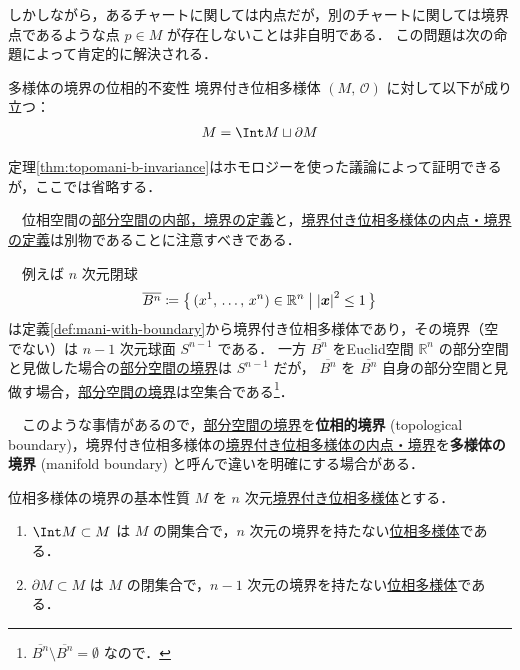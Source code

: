 \documentclass[geometry_main]{subfiles}
\begin{document}
しかしながら，あるチャートに関しては内点だが，別のチャートに関しては境界点であるような点 $p \in M$ が存在しないことは非自明である．
この問題は次の命題によって肯定的に解決される．

\begin{mytheo}[label=thm:topomani-b-invariance]{多様体の境界の位相的不変性}
	境界付き位相多様体 $(M,\, \mathscr{O})$ に対して以下が成り立つ：
	\begin{align}
		M = \Int M \sqcup \partial M
	\end{align}
\end{mytheo}

定理\ref{thm:topomani-b-invariance}はホモロジーを使った議論によって証明できるが，ここでは省略する．

\begin{marker}
	　位相空間の\hyperref[def:boundary-topo]{部分空間の内部，境界の定義}と，\hyperref[def:int-manifold-with-boundary]{境界付き位相多様体の内点・境界の定義}は別物であることに注意すべきである．

	　例えば $n$ 次元閉球
	\begin{align}
		\overline{B^n} \coloneqq \bigl\{\, (x^1,\, \dots ,\, x^n) \in \mathbb{R}^n \bigm| \abs{\vb*{x}}^2 \le 1 \,\bigr\} 
	\end{align}
	は定義\ref{def:mani-with-boundary}から境界付き位相多様体であり，その境界（空でない）は $n-1$ 次元球面 $S^{n-1}$ である．
	一方 $\overline{B^n}$ をEuclid空間 $\mathbb{R}^n$ の部分空間と見做した場合の\hyperref[def:boundary-topo]{部分空間の境界}は $S^{n-1}$ だが，
	$\overline{B^n}$ を $\overline{B^n}$ 自身の部分空間と見做す場合，\hyperref[def:boundary-topo]{部分空間の境界}は空集合である\footnote{$\overline{B^n} \setminus \overline{B^n} = \emptyset$ なので．}．

	　このような事情があるので，\hyperref[def:boundary-topo]{部分空間の境界}を\textbf{位相的境界} (topological boundary)，境界付き位相多様体の\hyperref[def:int-manifold-with-boundary]{境界付き位相多様体の内点・境界}を\textbf{多様体の境界} (manifold boundary) と呼んで違いを明確にする場合がある．
\end{marker}

\begin{myprop}[label=prop:manifold-boundary-basic]{位相多様体の境界の基本性質}
	$M$ を $n$ 次元\hyperref[def:mani-with-boundary]{境界付き位相多様体}とする．
	\begin{enumerate}
		\item $\Int M \subset M$ は $M$ の開集合で，$n$ 次元の境界を持たない\hyperref[def.topomani]{位相多様体}である．
		\item $\partial M \subset M$ は $M$ の閉集合で，$n-1$ 次元の境界を持たない\hyperref[def.topomani]{位相多様体}である．
	\end{enumerate}
\end{myprop}
\end{document}
